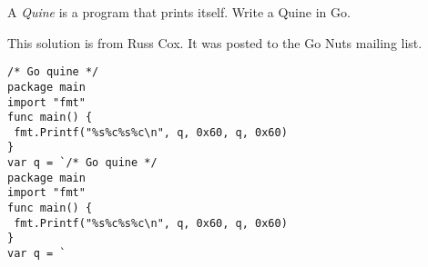 \begin{Exercise}[title={Quine},difficulty=9]
A \emph{Quine} is a program that prints itself.
\label{ex:quine}
\Question\label{ex:quine q1} Write a Quine in Go.
\end{Exercise}

\begin{Answer}
\begin{lbar}
This solution is from Russ Cox. It was posted to 
the Go Nuts mailing list.
\end{lbar}
\Question 
\begin{lstlisting}[caption=A Go quine]
/* Go quine */
package main
import "fmt"
func main() {
 fmt.Printf("%s%c%s%c\n", q, 0x60, q, 0x60)
}
var q = `/* Go quine */
package main
import "fmt"
func main() {
 fmt.Printf("%s%c%s%c\n", q, 0x60, q, 0x60)
}
var q = `
\end{lstlisting}
\end{Answer}
